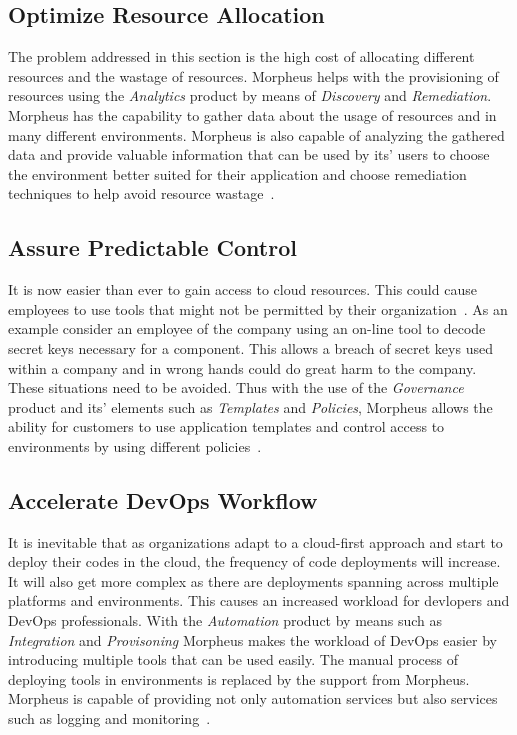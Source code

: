 \subsection{Optimize Resource Allocation}

The problem addressed in this section is the high cost of allocating different 
resources and the wastage of resources. Morpheus helps with the provisioning of 
resources using the \textit{Analytics} product by means of \textit{Discovery} 
and \textit{Remediation}. Morpheus has the capability to gather data about the 
usage of resources and in many different environments. Morpheus is also capable 
of analyzing the gathered data and provide valuable information that can be 
used by its' users to choose the environment better suited for their 
application and choose remediation techniques to help avoid resource 
wastage~\cite{hid-sp18-416-www-morpheus-product-guide}. 

\subsection{Assure Predictable Control}

It is now easier than ever to gain access to cloud resources. This could cause 
employees to use tools that might not be permitted by their 
organization~\cite{hid-sp18-416-www-shadowit-wikipedia}. As an example 
consider an employee of the company using an on-line tool to decode secret keys 
necessary for a component. This allows a breach of secret keys used within a 
company and in wrong hands could do great harm to the company. These 
situations need to be avoided. Thus with the use of the \textit{Governance} 
product and its' elements such as \textit{Templates} and \textit{Policies}, 
Morpheus allows the ability for customers to use application templates and 
control access to environments by using different 
policies~\cite{hid-sp18-416-www-morpheus-product-guide}.  

\subsection{Accelerate DevOps Workflow}

It is inevitable that as organizations adapt to a cloud-first approach and 
start to deploy their codes in the cloud, the frequency of code deployments 
will increase. It will also get more complex as there are deployments spanning 
across multiple platforms and environments. This causes an increased workload 
for devlopers and DevOps professionals. With the \textit{Automation} product by 
means such as \textit{Integration} and \textit{Provisoning} Morpheus makes the 
workload of DevOps easier by introducing multiple tools that can be used 
easily. The manual process of deploying tools in environments is replaced by 
the support from Morpheus. Morpheus is capable of providing not only 
automation services but also services such as logging and 
monitoring~\cite{hid-sp18-416-www-morpheus-product-guide}.  

